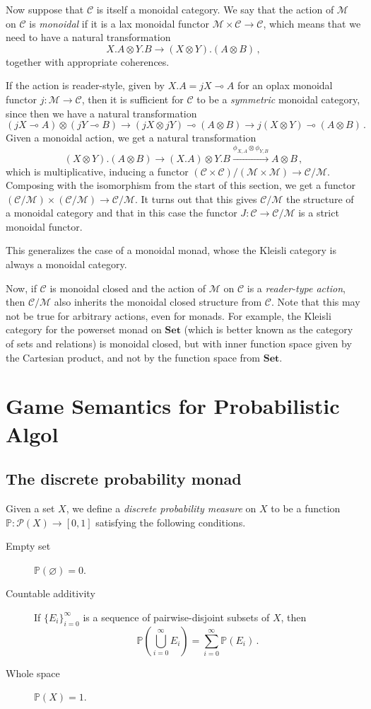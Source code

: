 \documentclass{svproc}
\newcommand\C{\mathcal{C}}
\newcommand\M{\mathcal{M}}
\newcommand\tensor\otimes
\renewcommand\implies\multimap
\let\emptyset\varnothing
\newcommand*\from{\colon}
\newcommand{\0}{{\mathtt{0}}} \newcommand{\com}{{\mathtt{com}}}
\newcommand{\catname}[1]{\mathbf{#1}}
\newcommand{\Set}{\catname{Set}}
\newcommand{\powerset}{\mathcal P}
\newcommand{\bP}{\mathbb{P}}
\renewcommand{\emptyset}{\varnothing}
\begin{document}
Now suppose that $\C$ is itself a monoidal category.  
We say that the action of $\M$ on $\C$ is \emph{monoidal} if it is a lax monoidal functor $\M\times\C\to\C$, which means that we need to have a natural transformation 
\[
  X.A\tensor Y.B\to (X\tensor Y).(A\tensor B)\,,
  \]
together with appropriate coherences.  

If the action is reader-style, given by $X.A = jX \implies A$ for an oplax monoidal functor $j\from \M\to \C$, then it is sufficient for $\C$ to be a \emph{symmetric} monoidal category, since then we have a natural transformation
\[
  (j X \implies A) \tensor (j Y \implies B)
  \rightarrow
  (j X \tensor j Y) \implies (A \tensor B)
  \rightarrow
  j (X\tensor Y) \implies (A \tensor B)\,.
  \]
Given a monoidal action, we get a natural transformation
\[
  (X\tensor Y).(A\tensor B)
  \rightarrow
  (X.A)\tensor Y.B
  \xrightarrow{\phi_{X,A}\tensor \phi_{Y,B}}
  A\tensor B\,,
  \]
which is multiplicative, inducing a functor $(\C\times\C)/(\M\times\M)\to \C/\M$.  
Composing with the isomorphism from the start of this section, we get a functor $(\C/\M)\times(\C/\M)\to\C/\M$.  
It turns out that this gives $\C/\M$ the structure of a monoidal category and that in this case the functor $J\from \C\to\C/\M$ is a strict monoidal functor.

This generalizes the case of a monoidal monad, whose the Kleisli category is always a monoidal category.

Now, if $\C$ is monoidal closed and the action of $\M$ on $\C$ is a \emph{reader-type action}, then $\C/\M$ also inherits the monoidal closed structure from $\C$.  
Note that this may not be true for arbitrary actions, even for monads.  
For example, the Kleisli category for the powerset monad on $\Set$ (which is better known as the category of sets and relations) is monoidal closed, but with inner function space given by the Cartesian product, and not by the function space from $\Set$.

\section{Game Semantics for Probabilistic Algol}

\subsection{The discrete probability monad}

Given a set $X$, we define a \emph{discrete probability measure} on $X$ to be a function $\bP\from\powerset(X)\to[0,1]$ satisfying the following conditions.
\begin{description}
  \item[Empty set] $\bP(\emptyset) = 0$.
  \item[Countable additivity] If $\{E_i\}_{i=0}^\infty$ is a sequence of pairwise-disjoint subsets of $X$, then
    \[
      \bP\left(\bigcup_{i=0}^\infty E_i\right) = \sum_{i=0}^\infty \bP(E_i)\,.
      \]
  \item[Whole space] $\bP(X)=1$.
\end{description}
\end{document}

